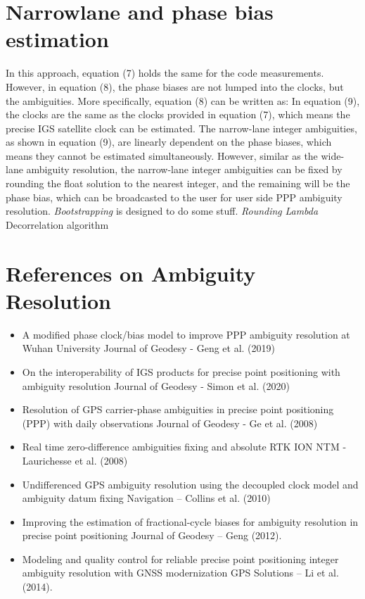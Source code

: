 \section{Narrowlane and phase bias estimation}
%
In this approach, equation (7) holds the same for the code measurements. However, in equation (8),
the phase biases are not lumped into the clocks, but the ambiguities. More specifically, equation (8)
can be written as:
%
In equation (9), the clocks are the same as the clocks provided in equation (7), which means the
precise IGS satellite clock can be estimated.
The narrow-lane integer ambiguities, as shown in equation (9), are linearly dependent on the phase
biases, which means they cannot be estimated simultaneously. However, similar as the wide-lane
ambiguity resolution, the narrow-lane integer ambiguities can be fixed by rounding the float solution
to the nearest integer, and the remaining will be the phase bias, which can be broadcasted to the
user for user side PPP ambiguity resolution.
%
\textit{Bootstrapping} is designed to do some stuff.
%
\textit{Rounding}
%
\textit{Lambda}
%
Decorrelation algorithm
%
%
\section{References on Ambiguity Resolution}
%
\begin{itemize}
    \item A modified phase clock/bias model to improve PPP ambiguity resolution at Wuhan University Journal of Geodesy - Geng et al. (2019)
    \item On the interoperability of IGS products for precise point positioning with ambiguity resolution Journal of Geodesy - Simon et al. (2020)
    \item Resolution of GPS carrier-phase ambiguities in precise point positioning (PPP) with daily observations Journal of Geodesy - Ge et al. (2008)
    \item Real time zero-difference ambiguities fixing and absolute RTK ION NTM - Laurichesse et al. (2008)
    \item Undifferenced GPS ambiguity resolution using the decoupled clock model and ambiguity datum fixing Navigation – Collins et al. (2010)
    \item Improving the estimation of fractional-cycle biases for ambiguity resolution in precise point positioning Journal of Geodesy – Geng (2012).
    \item Modeling and quality control for reliable precise point positioning integer ambiguity resolution with GNSS modernization
GPS Solutions – Li et al. (2014).
\end{itemize}